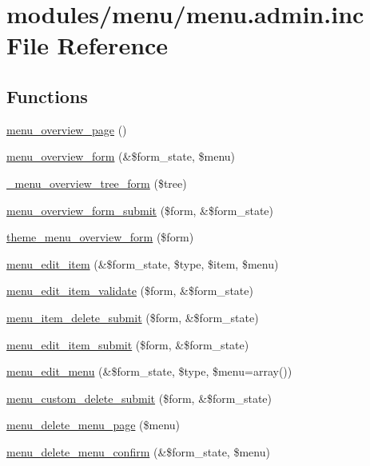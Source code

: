 \hypertarget{menu_8admin_8inc}{
\section{modules/menu/menu.admin.inc File Reference}
\label{menu_8admin_8inc}
}
\subsection*{Functions}
\begin{CompactItemize}
\item 
\hyperlink{menu_8admin_8inc_2815b30b87a9fb3bbda9cf044a81e25b}{menu\_\-overview\_\-page} ()
\item 
\hyperlink{menu_8admin_8inc_cddf1ae47e6d4796c437447fd1a1a88e}{menu\_\-overview\_\-form} (\&\$form\_\-state, \$menu)
\item 
\hyperlink{menu_8admin_8inc_15e0c24820f3445628b676e212e5fbcc}{\_\-menu\_\-overview\_\-tree\_\-form} (\$tree)
\item 
\hyperlink{menu_8admin_8inc_a16576d9e19529ee9f710dc3b5f5b810}{menu\_\-overview\_\-form\_\-submit} (\$form, \&\$form\_\-state)
\item 
\hyperlink{group__themeable_g4af0d13e1a7fdd7c08283101bbed6d2c}{theme\_\-menu\_\-overview\_\-form} (\$form)
\item 
\hyperlink{menu_8admin_8inc_e26836525f500f39cbe74dccea372926}{menu\_\-edit\_\-item} (\&\$form\_\-state, \$type, \$item, \$menu)
\item 
\hyperlink{menu_8admin_8inc_9b3b72516acaba98b8be3965616cc735}{menu\_\-edit\_\-item\_\-validate} (\$form, \&\$form\_\-state)
\item 
\hyperlink{menu_8admin_8inc_a0ab9f4cce0d1ece6c2151ad212e81f9}{menu\_\-item\_\-delete\_\-submit} (\$form, \&\$form\_\-state)
\item 
\hyperlink{menu_8admin_8inc_78694e41c7d0ed5105c324ca52974cb8}{menu\_\-edit\_\-item\_\-submit} (\$form, \&\$form\_\-state)
\item 
\hyperlink{menu_8admin_8inc_19f0a855d2fdee878127cf13865fdf87}{menu\_\-edit\_\-menu} (\&\$form\_\-state, \$type, \$menu=array())
\item 
\hyperlink{menu_8admin_8inc_be39d1c961ad32624a0c927ecb9ca611}{menu\_\-custom\_\-delete\_\-submit} (\$form, \&\$form\_\-state)
\item 
\hyperlink{menu_8admin_8inc_f56ae21f49fb3d481e215ad875f9b4f2}{menu\_\-delete\_\-menu\_\-page} (\$menu)
\item 
\hyperlink{menu_8admin_8inc_ba71f7fe1edefa473c9ffa0130238f19}{menu\_\-delete\_\-menu\_\-confirm} (\&\$form\_\-state, \$menu)

\end{CompactItemize}
